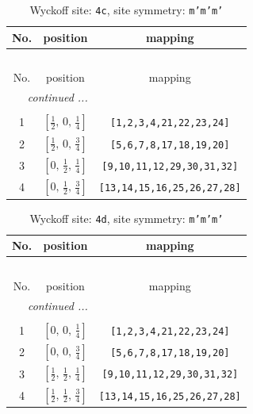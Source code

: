 \documentclass[fleqn,8pt]{jsarticle}
\begin{document}
\renewcommand{\arraystretch}{1.2}
\begin{longtable}{ccc}
\caption{Wyckoff site: {\tt 4c}, site symmetry: {\tt m'm'm'}}
 \\
 \hline \hline
No. & position & mapping \\ \hline \endfirsthead

\multicolumn{2}{l}{\tablename\ \thetable{}} \\
 \hline \hline
No. & position & mapping \\ \hline \endhead

 \hline \hline
\multicolumn{2}{r}{\footnotesize\it continued ...} \\ \endfoot

 \hline \hline
\multicolumn{2}{r}{} \\ \endlastfoot

1 & $\left[ \frac{1}{2},\, 0,\, \frac{1}{4} \right]$ & {\tt [1,2,3,4,21,22,23,24]} \\ \hline
2 & $\left[ \frac{1}{2},\, 0,\, \frac{3}{4} \right]$ & {\tt [5,6,7,8,17,18,19,20]} \\ \hline
3 & $\left[ 0,\, \frac{1}{2},\, \frac{1}{4} \right]$ & {\tt [9,10,11,12,29,30,31,32]} \\ \hline
4 & $\left[ 0,\, \frac{1}{2},\, \frac{3}{4} \right]$ & {\tt [13,14,15,16,25,26,27,28]} \\
\end{longtable}
\renewcommand{\arraystretch}{1.2}
\begin{longtable}{ccc}
\caption{Wyckoff site: {\tt 4d}, site symmetry: {\tt m'm'm'}}
 \\
 \hline \hline
No. & position & mapping \\ \hline \endfirsthead

\multicolumn{2}{l}{\tablename\ \thetable{}} \\
 \hline \hline
No. & position & mapping \\ \hline \endhead

 \hline \hline
\multicolumn{2}{r}{\footnotesize\it continued ...} \\ \endfoot

 \hline \hline
\multicolumn{2}{r}{} \\ \endlastfoot

1 & $\left[ 0,\, 0,\, \frac{1}{4} \right]$ & {\tt [1,2,3,4,21,22,23,24]} \\ \hline
2 & $\left[ 0,\, 0,\, \frac{3}{4} \right]$ & {\tt [5,6,7,8,17,18,19,20]} \\ \hline
3 & $\left[ \frac{1}{2},\, \frac{1}{2},\, \frac{1}{4} \right]$ & {\tt [9,10,11,12,29,30,31,32]} \\ \hline
4 & $\left[ \frac{1}{2},\, \frac{1}{2},\, \frac{3}{4} \right]$ & {\tt [13,14,15,16,25,26,27,28]} \\
\end{longtable}
\end{document}

